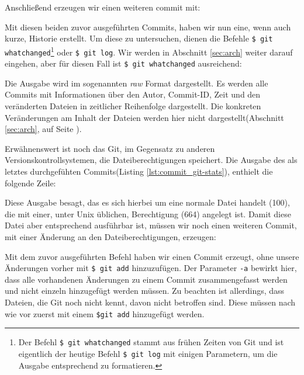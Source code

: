 Anschließend erzeugen wir einen weiteren \gls{commit} mit:


Mit diesen beiden zuvor ausgeführten Commits, haben wir nun eine, wenn auch
kurze, Historie erstellt. Um diese zu untersuchen, dienen die Befehle
\texttt{\$ git whatchanged}\footnote{Der Befehl \texttt{\$ git whatchanged}
stammt aus frühen Zeiten von Git und ist eigentlich der heutige Befehl
\texttt{\$ git log} mit einigen Parametern, um die Ausgabe entsprechend zu
formatieren.} oder \texttt{\$ git log}. Wir werden in Abschnitt \ref{sec:arch}
weiter darauf eingehen, aber für diesen Fall ist \texttt{\$ git whatchanged}
ausreichend:


Die Ausgabe wird im sogenannten \textit{raw} Format dargestellt. Es werden alle
Commits mit Informationen über den Autor, Commit-ID, Zeit und den veränderten
Dateien in zeitlicher Reihenfolge dargestellt. Die konkreten Veränderungen am
Inhalt der Dateien werden hier nicht dargestellt(Abschnitt \ref{sec:arch}, auf
Seite \pageref{sec:arch}).

Erwähnenswert ist noch das Git, im Gegensatz zu anderen
Versionskontrollsystemen, die Dateiberechtigungen speichert. Die Ausgabe des
als letztes durchgefühten Commits(Listing \ref{lst:commit_git-stats}), enthielt
die folgende Zeile:


Diese Ausgabe besagt, das es sich hierbei um eine normale Datei handelt (100),
die mit einer, unter Unix üblichen, Berechtigung (664) angelegt ist. Damit
diese Datei aber entsprechend ausführbar ist, müssen wir noch einen weiteren
Commit, mit einer Änderung an den Dateiberechtigungen, erzeugen:


Mit dem zuvor ausgeführten Befehl haben wir einen Commit erzeugt, ohne unsere
Änderungen vorher mit \texttt{\$ git add} hinzuzufügen. Der Parameter
\texttt{-a} bewirkt hier, dass alle vorhandenen Änderungen zu einem Commit
zusammengefasst werden und nicht einzeln hinzugefügt werden müssen. Zu beachten
ist allerdings, dass Dateien, die Git noch nicht kennt, davon nicht betroffen
sind. Diese müssen nach wie vor zuerst mit einem \texttt{\$git add} hinzugefügt
werden.

